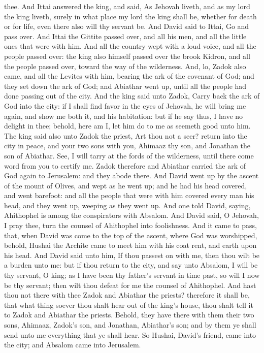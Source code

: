thee. And Ittai answered the king, and said, As Jehovah liveth, and as my lord the king liveth, surely in what place my lord the king shall be, whether for death or for life, even there also will thy servant be. And David said to Ittai, Go and pass over. And Ittai the Gittite passed over, and all his men, and all the little ones that were with him. And all the country wept with a loud voice, and all the people passed over: the king also himself passed over the brook Kidron, and all the people passed over, toward the way of the wilderness.  And, lo, Zadok also came, and all the Levites with him, bearing the ark of the covenant of God; and they set down the ark of God; and Abiathar went up, until all the people had done passing out of the city. And the king said unto Zadok, Carry back the ark of God into the city: if I shall find favor in the eyes of Jehovah, he will bring me again, and show me both it, and his habitation: but if he say thus, I have no delight in thee; behold, here am I, let him do to me as seemeth good unto him. The king said also unto Zadok the priest, Art thou not a seer? return into the city in peace, and your two sons with you, Ahimaaz thy son, and Jonathan the son of Abiathar. See, I will tarry at the fords of the wilderness, until there come word from you to certify me. Zadok therefore and Abiathar carried the ark of God again to Jerusalem: and they abode there.  And David went up by the ascent of the mount of Olives, and wept as he went up; and he had his head covered, and went barefoot: and all the people that were with him covered every man his head, and they went up, weeping as they went up. And one told David, saying, Ahithophel is among the conspirators with Absalom. And David said, O Jehovah, I pray thee, turn the counsel of Ahithophel into foolishness. And it came to pass, that, when David was come to the top of the ascent, where God was worshipped, behold, Hushai the Archite came to meet him with his coat rent, and earth upon his head. And David said unto him, If thou passest on with me, then thou wilt be a burden unto me: but if thou return to the city, and say unto Absalom, I will be thy servant, O king; as I have been thy father’s servant in time past, so will I now be thy servant; then wilt thou defeat for me the counsel of Ahithophel. And hast thou not there with thee Zadok and Abiathar the priests? therefore it shall be, that what thing soever thou shalt hear out of the king’s house, thou shalt tell it to Zadok and Abiathar the priests. Behold, they have there with them their two sons, Ahimaaz, Zadok’s son, and Jonathan, Abiathar’s son; and by them ye shall send unto me everything that ye shall hear. So Hushai, David’s friend, came into the city; and Absalom came into Jerusalem. 


